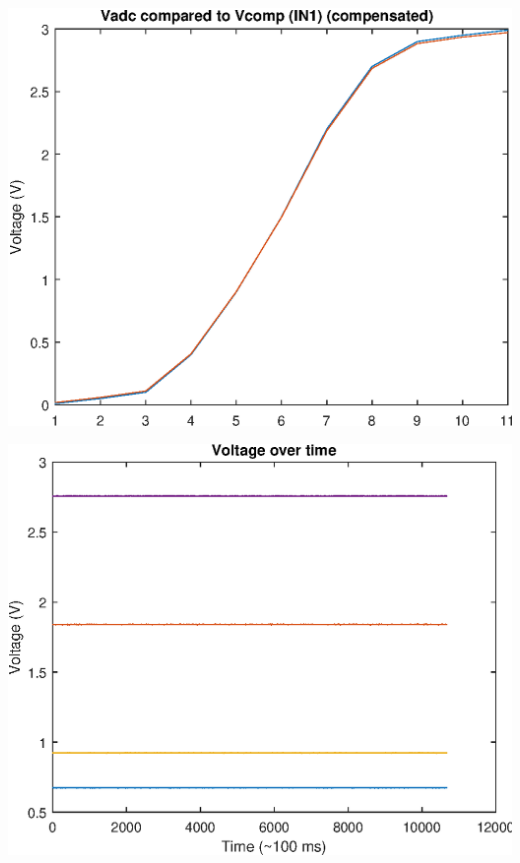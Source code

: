 \includegraphics[width=\SchematicWidth]{images/ADC/gain-compensated.eps}

\includegraphics[width=\SchematicWidth]{images/ADC/time-deviation.eps}

